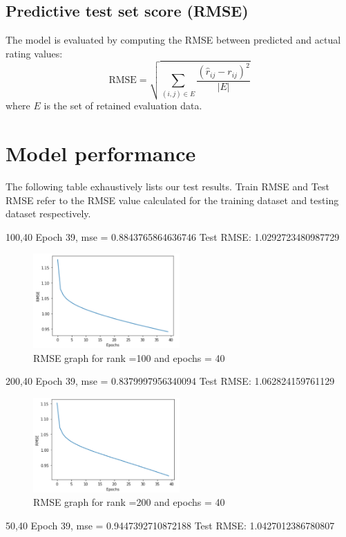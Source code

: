 \documentclass[final]{cvpr}
\begin{document}
\subsection{Predictive test set score (RMSE)}
The model is evaluated by computing the RMSE between predicted and actual rating values:
$$ \text{RMSE} = \sqrt{\sum_{(i, j) \in E} \frac{{(\hat r_{ij} - r_{ij})}^2}{\left| E \right|}} $$
where $E$ is the set of retained evaluation data.

\section{Model performance}
The following table exhaustively lists our test results. Train RMSE and Test RMSE refer to the RMSE value calculated for the training dataset and testing dataset respectively.

100,40
Epoch 39, mse = 0.8843765864636746
Test RMSE: 1.0292723480987729

\begin{figure}[h]
	\includegraphics[width=0.5\textwidth]{./100_40_graph.PNG}
	\caption{RMSE graph for rank =100 and epochs = 40}
\end{figure}

200,40
Epoch 39, mse = 0.8379997956340094
Test RMSE: 1.062824159761129

\begin{figure}[h]
	\includegraphics[width=0.5\textwidth]{./200_40_graph.PNG}
	\caption{RMSE graph for rank =200 and epochs = 40}
\end{figure}

50,40
Epoch 39, mse = 0.9447392710872188
Test RMSE: 1.0427012386780807
\end{document}
